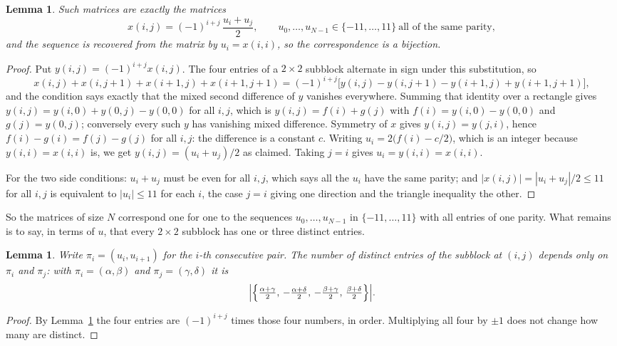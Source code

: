 \documentclass[11pt,a4paper]{article}
\theoremstyle{plain}
\newtheorem{lemma}[theorem]{Lemma}
\theoremstyle{definition}
\begin{document}
\begin{lemma}\label{lem:solve}
Such matrices are exactly the matrices
\[
x(i,j)=(-1)^{i+j}\,\frac{u_i+u_j}{2},
\qquad u_0,\dots,u_{N-1}\in\{-11,\dots,11\}\ \text{all of the same parity},
\]
and the sequence is recovered from the matrix by $u_i=x(i,i)$, so the correspondence is a
bijection.
\end{lemma}

\begin{proof}
Put $y(i,j)=(-1)^{i+j}x(i,j)$. The four entries of a $2\times2$ subblock alternate in sign
under this substitution, so
\[
x(i,j)+x(i,j{+}1)+x(i{+}1,j)+x(i{+}1,j{+}1)
=(-1)^{i+j}\bigl[y(i,j)-y(i,j{+}1)-y(i{+}1,j)+y(i{+}1,j{+}1)\bigr],
\]
and the condition says exactly that the mixed second difference of $y$ vanishes everywhere.
Summing that identity over a rectangle gives
$y(i,j)=y(i,0)+y(0,j)-y(0,0)$ for all $i,j$, which is $y(i,j)=f(i)+g(j)$ with
$f(i)=y(i,0)-y(0,0)$ and $g(j)=y(0,j)$; conversely every such $y$ has vanishing mixed
difference. Symmetry of $x$ gives $y(i,j)=y(j,i)$, hence $f(i)-g(i)=f(j)-g(j)$ for all $i,j$:
the difference is a constant $c$. Writing $u_i=2\bigl(f(i)-c/2\bigr)$, which is an integer
because $y(i,i)=x(i,i)$ is, we get $y(i,j)=(u_i+u_j)/2$ as claimed. Taking $j=i$ gives
$u_i=y(i,i)=x(i,i)$.

For the two side conditions: $u_i+u_j$ must be even for all $i,j$, which says all the $u_i$ have
the same parity; and $|x(i,j)|=|u_i+u_j|/2\le11$ for all $i,j$ is equivalent to $|u_i|\le11$
for each $i$, the case $j=i$ giving one direction and the triangle inequality the other.
\end{proof}

So the matrices of size $N$ correspond one for one to the sequences $u_0,\dots,u_{N-1}$ in
$\{-11,\dots,11\}$ with all entries of one parity. What remains is to say, in terms of $u$,
that every $2\times2$ subblock has one or three distinct entries.

\begin{lemma}\label{lem:block}
Write $\pi_i=(u_i,u_{i+1})$ for the $i$-th consecutive pair. The number of distinct entries of
the subblock at $(i,j)$ depends only on $\pi_i$ and $\pi_j$: with $\pi_i=(\alpha,\beta)$ and
$\pi_j=(\gamma,\delta)$ it is
\[
\Bigl|\Bigl\{\tfrac{\alpha+\gamma}{2},\,-\tfrac{\alpha+\delta}{2},\,
-\tfrac{\beta+\gamma}{2},\,\tfrac{\beta+\delta}{2}\Bigr\}\Bigr| .
\]
\end{lemma}

\begin{proof}
By Lemma~\ref{lem:solve} the four entries are $(-1)^{i+j}$ times those four numbers, in
order. Multiplying all four by $\pm1$ does not change how many are distinct.
\end{proof}
\end{document}
